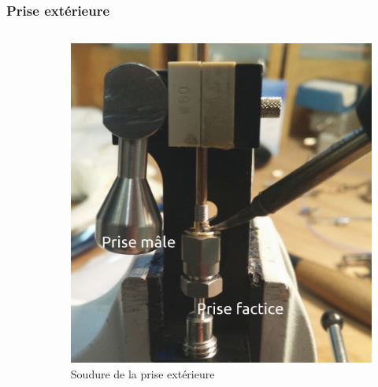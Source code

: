 \documentclass[8pt,a9paper]{beamer} \usepackage[utf8]{inputenc} \usepackage[francais]{babel} \usepackage[T1]{fontenc}
\begin{document}
\begin{frame}
\frametitle{Prise extérieure}
\begin{columns}
\begin{column}{0.5\textwidth}
    \begin{description}
        \item[]~\\
    \end{description}
\end{column}
\begin{column}{0.5\textwidth}
\begin{figure}[h]
    \begin{center}
        \includegraphics[width=\textwidth]{Images/Coax/4}
        \caption{Soudure de la prise extérieure}
    \end{center}
\end{figure}
\end{column}
\end{columns}
\end{frame}
\end{document}
